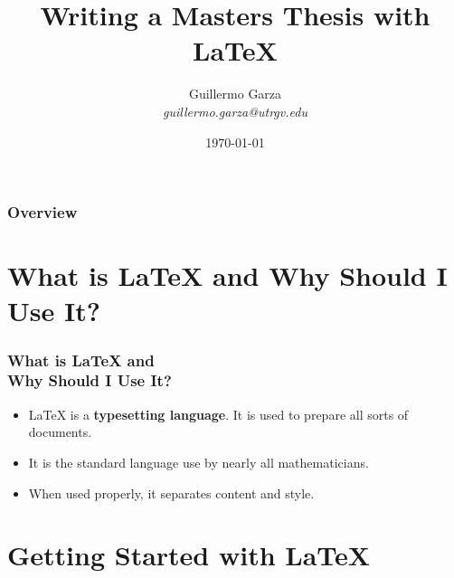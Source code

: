 \documentclass{beamer}
\title[Thesis with \LaTeX]{Writing a Masters Thesis with \LaTeX} %
\author{%
  Guillermo Garza\\[2pt]%
 \footnotesize\textit{guillermo.garza@utrgv.edu} %
}
\institute[UTRGV] %
{The University of Texas Rio Grande Valley}
\date{\today} %
\begin{document}
\begin{frame}
  \titlepage
\end{frame}


\begin{frame}
\frametitle{Overview} %
\tableofcontents %
\end{frame}


\section{What is \LaTeX{} and Why Should I Use It?}

\begin{frame}
\frametitle{What is \LaTeX{} and\\ Why Should I Use It?}

\begin{itemize}
  \item
    \LaTeX{} is a \textbf{typesetting language}.  It is used to prepare all sorts of
    documents.
  \item
    It is the standard language use by nearly all mathematicians.
  \item
     When used properly, it separates content and style.
\end{itemize}


\end{frame}



\section{Getting Started with \LaTeX}
\end{document}
